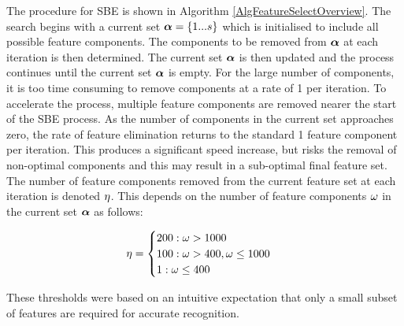 The procedure for \acs{SBE} is shown in Algorithm \ref{AlgFeatureSelectOverview}. %
The search begins with a current set $\boldsymbol\alpha = \{1...s\}$ which is initialised to include all possible feature components. The components to be removed from $\boldsymbol\alpha$ at each iteration is then determined. The current set $\boldsymbol\alpha$ is then updated and the process continues until the current set $\boldsymbol\alpha$ is empty. For the large number of components, it is too time consuming to remove components at a rate of 1 per iteration. To accelerate the process, multiple feature components are removed nearer the start of the \ac{SBE} process. As the number of components in the current set approaches zero, the rate of feature elimination returns to the standard 1 feature component per iteration. This produces a significant speed increase, but risks the removal of non-optimal components and this may result in a sub-optimal final feature set. The number of feature components removed from the current feature set at each iteration is denoted $\eta$. This depends on the number of feature components $\omega$ in the current set $\boldsymbol\alpha$ as follows:

\begin{gather}
\label{EquationNumFeaturesToRemove}
\eta = \begin{cases}
200 : \omega > 1000 \\
100 : \omega > 400, \omega \le 1000 \\
1 : \omega \le 400
\end{cases}
\end{gather}

These thresholds were based on an intuitive expectation that only a small subset of features are required for accurate recognition.



